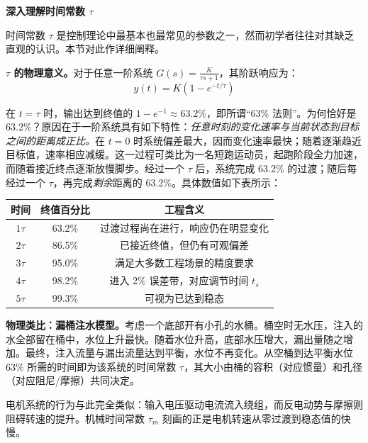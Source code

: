 \vspace{0.5em}
\begin{mdframed}[linewidth=1pt, innertopmargin=10pt, innerbottommargin=10pt]
\textbf{深入理解时间常数 $\tau$}

\vspace{0.3em}
时间常数 $\tau$ 是控制理论中最基本也最常见的参数之一，然而初学者往往对其缺乏直观的认识。本节对此作详细阐释。

\textbf{$\tau$ 的物理意义。}对于任意一阶系统 $G(s) = \frac{K}{\tau s + 1}$，其阶跃响应为：
\[
y(t) = K\left(1 - e^{-t/\tau}\right)
\]

在 $t = \tau$ 时，输出达到终值的 $1 - e^{-1} \approx 63.2\%$，即所谓``63\% 法则''。为何恰好是 63.2\%？原因在于一阶系统具有如下特性：\textit{任意时刻的变化速率与当前状态到目标之间的距离成正比。}在 $t = 0$ 时系统偏差最大，因而变化速率最快；随着逐渐趋近目标值，速率相应减缓。这一过程可类比为一名短跑运动员，起跑阶段全力加速，而随着接近终点逐渐放慢脚步。经过一个 $\tau$ 后，系统完成 63.2\% 的过渡；随后每经过一个 $\tau$，再完成\textit{剩余}距离的 63.2\%。具体数值如下表所示：

\begin{center}
\begin{tabular}{ccc}
\toprule
\textbf{时间} & \textbf{终值百分比} & \textbf{工程含义} \\
\midrule
$1\tau$ & 63.2\% & 过渡过程尚在进行，响应仍在明显变化 \\
$2\tau$ & 86.5\% & 已接近终值，但仍有可观偏差 \\
$3\tau$ & 95.0\% & 满足大多数工程场景的精度要求 \\
$4\tau$ & 98.2\% & 进入 2\% 误差带，对应调节时间 $t_s$ \\
$5\tau$ & 99.3\% & 可视为已达到稳态 \\
\bottomrule
\end{tabular}
\end{center}

\textbf{物理类比：漏桶注水模型。}考虑一个底部开有小孔的水桶。桶空时无水压，注入的水全部留在桶中，水位上升最快。随着水位升高，底部水压增大，漏出量随之增加。最终，注入流量与漏出流量达到平衡，水位不再变化。从空桶到达平衡水位 63\% 所需的时间即为该系统的时间常数 $\tau$，其大小由桶的容积（对应惯量）和孔径（对应阻尼/摩擦）共同决定。

电机系统的行为与此完全类似：输入电压驱动电流流入绕组，而反电动势与摩擦则阻碍转速的提升。机械时间常数 $\tau_m$ 刻画的正是电机转速从零过渡到稳态值的快慢。


\end{mdframed}

